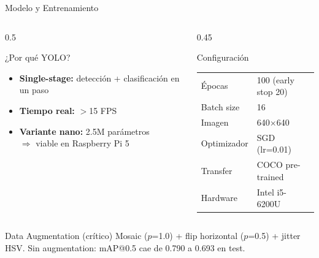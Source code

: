 \documentclass[aspectratio=169,10pt]{beamer}
\begin{document}
\begin{frame}{Modelo y Entrenamiento}
  \begin{columns}[T]
    \begin{column}{0.5\textwidth}
      \begin{block}{¿Por qué YOLO?}
        \begin{itemize}
          \item \textbf{Single-stage:} detección + clasificación en un paso
          \item \textbf{Tiempo real:} $>$15 FPS
          \item \textbf{Variante nano:} 2.5M parámetros\\
                $\Rightarrow$ viable en Raspberry Pi 5
        \end{itemize}
      \end{block}
    \end{column}
    \begin{column}{0.45\textwidth}
      \begin{block}{Configuración}
        \centering
        \begin{tabular}{ll}
          \toprule
          Épocas        & 100 (early stop 20) \\
          Batch size    & 16 \\
          Imagen        & 640$\times$640 \\
          Optimizador   & SGD (lr=0.01) \\
          Transfer      & COCO pre-trained \\
          Hardware      & Intel i5-6200U \\
          \bottomrule
        \end{tabular}
      \end{block}
    \end{column}
  \end{columns}
  \vspace{0.3cm}
  \begin{block}{Data Augmentation (crítico)}
    Mosaic ($p$=1.0) + flip horizontal ($p$=0.5) + jitter HSV.
    Sin augmentation: mAP@0.5 cae de 0.790 a \alert{0.693} en test.
  \end{block}
\end{frame}
\end{document}
